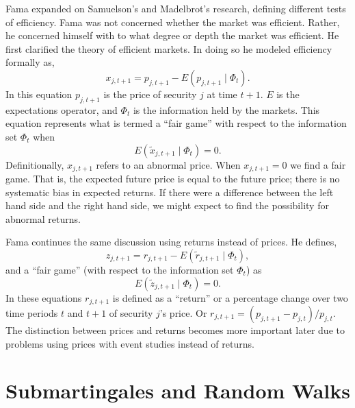 Fama \cite{fama70}
expanded on Samuelson's and Madelbrot's research, defining
different tests of efficiency.  Fama was not concerned
whether the market was efficient.  Rather, he
concerned himself with to what degree or depth the market
was efficient. He first clarified the theory of
efficient markets.  In doing so he modeled efficiency
formally as,
\begin{equation}
x_{j,t+1}=p_{j,t+1}-E(p_{j,t+1} \mid \Phi_{t}).
\end{equation}
In this equation $p_{j,t+1}$
is the price of security $j$ at time $t+1$.  $E$ is
the expectations operator, and $\Phi_{t}$
is the information held by
the markets.  This equation 
represents what is termed a  ``fair game'' with respect to the
information set $\Phi_{t}$ when
\begin{equation}
E(\tilde x_{j,t+1} \mid \Phi_{t})=0.
\end{equation}
Definitionally, $x_{j,t+1}$
refers to an abnormal price.  When $x_{j,t+1}=0$ we find a
fair game.  That is, the
expected future price is
equal to the future price; there is no systematic bias in expected
returns.
If there were a difference between the left hand side and
the right hand side, we might expect to find the possibility
for abnormal returns.

Fama continues the same discussion using returns instead of
prices.  He defines,
\begin{equation}
z_{j,t+1}=r_{j,t+1}-E(\tilde r_{j,t+1} \mid \Phi_{t}),
\end{equation}
and a ``fair game'' (with respect to the information set
$\Phi_{t}$) as
\begin{equation}
E(\tilde z_{j,t+1} \mid \Phi_{t}) = 0.
\end{equation}
In these equations $r_{j,t+1}$ is defined as a ``return'' or a
percentage
change over two time periods $t$ and $t+1$ of security $j$'s price. 
Or $r_{j,t+1} = (p_{j,t+1}-p_{j,t})/p_{j,t}$.  The distinction
between prices and returns becomes more important later 
due to problems using prices with event studies instead of
returns.

\section{Submartingales and Random Walks}

